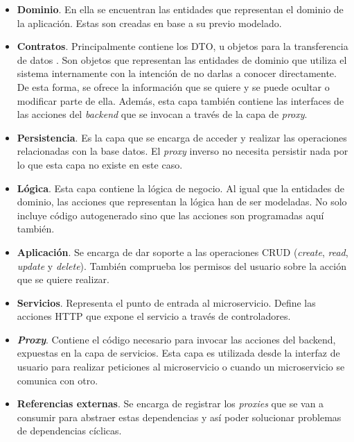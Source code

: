 \documentclass[11pt,spanish,listoffigures]{tfgetsinf}
\begin{document}
\begin{itemize}

	\item \textbf{Dominio}. En ella se encuentran las entidades que representan el dominio de la aplicación. Estas son creadas en base a su previo modelado.

	\item \textbf{Contratos}. Principalmente contiene los DTO, u objetos para la transferencia de datos \cite{DTO}. Son objetos que representan las entidades de dominio que utiliza el sistema internamente con la intención de no darlas a conocer directamente. De esta forma, se ofrece la información que se quiere y se puede ocultar o modificar parte de ella. Además, esta capa también contiene las interfaces de las acciones del \emph{backend} que se invocan a través de la capa de \emph{proxy}.

	\item \textbf{Persistencia}. Es la capa que se encarga de acceder y realizar las operaciones relacionadas con la base datos. El \emph{proxy} inverso no necesita persistir nada por lo que esta capa no existe en este caso.

	\item \textbf{Lógica}. Esta capa contiene la lógica de negocio. Al igual que la entidades de dominio, las acciones que representan la lógica han de ser modeladas. No solo incluye código autogenerado sino que las acciones son programadas aquí también.

	\item \textbf{Aplicación}. Se encarga de dar soporte a las operaciones CRUD (\emph{create}, \emph{read}, \emph{update} y \emph{delete}). También comprueba los permisos del usuario sobre la acción que se quiere realizar.

	\item \textbf{Servicios}. Representa el punto de entrada al microservicio. Define las acciones HTTP que expone el servicio a través de controladores.

	\item \textbf{\emph{Proxy}}. Contiene el código necesario para invocar las acciones del backend, expuestas en la capa de servicios. Esta capa es utilizada desde la interfaz de usuario para realizar peticiones al microservicio o cuando un microservicio se comunica con otro.

	\item \textbf{Referencias externas}. Se encarga de registrar los \emph{proxies} que se van a consumir para abstraer estas dependencias y así poder solucionar problemas de dependencias cíclicas.

\end{itemize}
\end{document}
